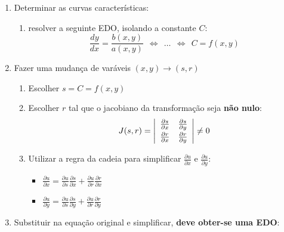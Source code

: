 \documentclass[11pt, a4paper]{article}
\begin{document}
\begin{enumerate}
    \item Determinar as curvas características:
    \begin{enumerate}
        \item resolver a seguinte EDO, isolando a constante $C$:
        \begin{equation*}
            \frac{dy}{dx} = \frac{b(x,y)}{a(x,y)} \ \ \Leftrightarrow \ \ 
            \ldots \ \ \Leftrightarrow \ \ C = f(x,y)
        \end{equation*}
    \end{enumerate}
    \item Fazer uma mudança de varáveis $(x,y) \rightarrow (s,r)$
    \begin{enumerate}
        \item Escolher $s = C = f(x,y)$
        \item Escolher $r$ tal que o jacobiano da transformação seja \textbf{não nulo}:
        \begin{equation*}
            J(s, r) =
            \left\lvert
            \begin{array}{l l}
                \frac{\partial s}{\partial x} &
                \frac{\partial s}{\partial y} \vspace{2pt} \\
                \frac{\partial r}{\partial x} &
                \frac{\partial r}{\partial y}
            \end{array}
            \right\rvert \ne 0
        \end{equation*}
        \item Utilizar a regra da cadeia para simplificar 
        $\frac{\partial u}{\partial x}$ e $\frac{\partial u}{\partial y}$:
        \begin{itemize}
            \item $\displaystyle \frac{\partial u}{\partial x} = 
            \frac{\partial u}{\partial s} \frac{\partial s}{\partial x} + 
            \frac{\partial u}{\partial r} \frac{\partial r}{\partial x}$
            \item $\displaystyle \frac{\partial u}{\partial y} = 
            \frac{\partial u}{\partial s} \frac{\partial s}{\partial y} + 
            \frac{\partial u}{\partial r} \frac{\partial r}{\partial y}$
        \end{itemize}
    \end{enumerate}
    \item Substituir na equação original e simplificar, \textbf{deve obter-se uma EDO}:

\end{enumerate}
\end{document}
